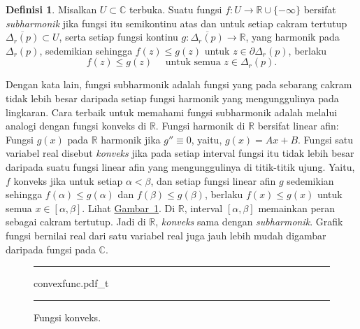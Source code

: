 \documentclass[12pt,openany]{book}
\newcommand{\C}{{\mathbb{C}}}
\newcommand{\R}{{\mathbb{R}}}
\newcommand{\myindex}[1]{#1\index{#1}}
\theoremstyle{plain}
\theoremstyle{remark}
\theoremstyle{definition}
\newtheorem{defn}[thm]{Definisi}
\newenvironment{myfig}{%
\begin{figure}[h!t]
\noindent\rule{\textwidth}{0.5pt}\vspace{12pt}\par\centering}%
{\par\noindent\rule{\textwidth}{0.5pt}
\end{figure}}
\theoremstyle{exercise}
\theoremstyle{example}
\newcommand{\figureref}[1]{\hyperref[#1]{Gambar~\ref*{#1}}}
\begin{document}
\begin{defn}
Misalkan $U \subset \C$ terbuka.
Suatu fungsi $f \colon U \to \R \cup \{ -\infty \}$ bersifat 
\emph{\myindex{subharmonik}} jika fungsi itu semikontinu atas
dan untuk setiap cakram tertutup $\overline{\Delta_r(p)} \subset U$,
serta setiap fungsi kontinu $g \colon \overline{\Delta_r(p)} \to \R$,
yang harmonik pada $\Delta_r(p)$,
sedemikian sehingga $f(z) \leq g(z)$ untuk $z \in \partial \Delta_r(p)$, berlaku
\begin{equation*}
f(z) \leq g(z) \quad \text{ untuk semua } z \in \Delta_r(p) .
\end{equation*}
\end{defn}

Dengan kata lain, fungsi subharmonik adalah fungsi yang pada sebarang cakram
tidak lebih besar daripada setiap fungsi harmonik yang mengunggulinya pada lingkaran.
Cara terbaik untuk memahami fungsi subharmonik adalah melalui analogi dengan fungsi
konveks di $\R$.
Fungsi harmonik di $\R$ bersifat linear afin:
Fungsi $g(x)$ pada $\R$ harmonik jika $g'' \equiv 0$, yaitu, $g(x) = Ax+B$.
Fungsi satu variabel real disebut
\emph{konveks} jika 
pada setiap interval fungsi itu tidak lebih besar daripada suatu fungsi linear afin yang
mengunggulinya di titik-titik ujung.
Yaitu,
$f$ konveks jika untuk setiap $\alpha < \beta$,
dan setiap fungsi linear afin $g$ sedemikian sehingga
$f(\alpha) \leq g(\alpha)$
dan
$f(\beta) \leq g(\beta)$,
berlaku
$f(x) \leq g(x)$ untuk semua $x \in [\alpha,\beta]$.
Lihat \figureref{fig:convexfunc}.
Di $\R$, interval $[\alpha,\beta]$ memainkan peran sebagai cakram tertutup.
Jadi di $\R$, \emph{konveks} sama dengan \emph{subharmonik}.
Grafik fungsi bernilai real dari satu variabel real
juga jauh lebih mudah digambar daripada fungsi pada $\C$.

\begin{myfig}
{convexfunc.pdf_t}
\caption{Fungsi konveks.\label{fig:convexfunc}}
\end{myfig}
\end{document}

